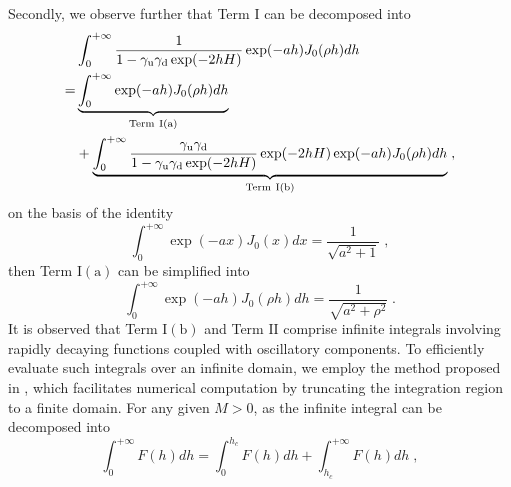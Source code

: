 Secondly, we observe further that Term $\mathrm{I}$ can be decomposed into
\begin{align*}
&\int_0^{+\infty} \frac{1}{1-\gamma_{\mathrm{u}}\gamma_{\mathrm{d}}\exp(-2hH)}  \exp(-ah)  J_0(\rho h)d h\\
=&\underbrace{\int_0^{+\infty}   \exp(-ah)  J_0(\rho h)d h}_{\text{Term}~\mathrm{I(a)}}\\
&+\underbrace{\int_0^{+\infty} \frac{\gamma_{\mathrm{u}}\gamma_{\mathrm{d}}}{1-\gamma_{\mathrm{u}}\gamma_{\mathrm{d}}\exp(-2hH)}  \exp(-2hH)\exp(-ah)  J_0(\rho h)d h}_{\text{Term}~\mathrm{I(b)}}\;,
\end{align*}
on the basis of the identity
\begin{equation*}
    \int_0^{+\infty}\exp(-ax) J_0(x)d x=\frac{1}{\sqrt{a^2+1}}\;,
\end{equation*}
then Term $\mathrm{I(a)}$ can be simplified into 
\begin{equation}\label{eq...text...TermI(A)}
    \int_0^{+\infty}   \exp(-ah)  J_0(\rho h)d h=\frac{1}{\sqrt{a^2+\rho^2}}\;.
\end{equation}
It is observed that Term $\mathrm{I(b)}$ and Term $\mathrm{II}$  comprise infinite integrals involving rapidly decaying functions coupled with oscillatory components. To efficiently evaluate such integrals over an infinite domain, we employ the method proposed in \cite{trefethen2022exactness}, which facilitates numerical computation by truncating the integration region to a finite domain. 
For any given 
$M>0$, as the infinite integral can be decomposed into
\begin{equation*}
 \int_0^{+\infty} F(h)d  h=  \int_0^{h_c} F(h)d  h+\int_{h_c}^{+\infty} F(h)d  h\;,
\end{equation*} 
